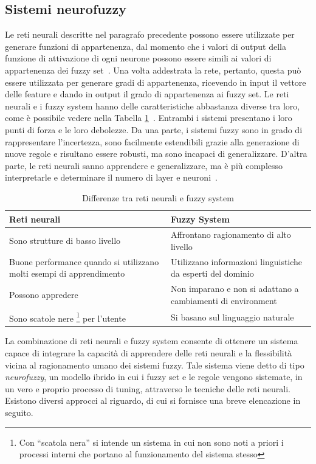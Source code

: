 \documentclass[11pt,  oneside, openany]{book}
\begin{document}
\subsection{Sistemi neurofuzzy}
Le reti neurali descritte nel paragrafo precedente possono essere utilizzate per generare funzioni di appartenenza, dal momento che i valori di output della funzione di attivazione di ogni neurone possono essere simili ai valori di appartenenza dei fuzzy set~\cite{membneuralnetwsimilar}. Una volta addestrata la rete, pertanto, questa può essere utilizzata per generare gradi di appartenenza, ricevendo in input il vettore delle feature e dando in output il grado di appartenenza ai fuzzy set. Le reti neurali e i fuzzy system hanno delle caratteristiche abbastanza diverse tra loro, come è possibile vedere nella Tabella \ref{table:0}~\cite{neurofuzzyintro}. Entrambi i sistemi presentano i loro punti di forza e le loro debolezze. Da una parte, i sistemi fuzzy sono in grado di rappresentare l'incertezza, sono facilmente estendibili grazie alla generazione di nuove regole e risultano essere robusti, ma sono incapaci di generalizzare. D'altra parte, le reti neurali sanno apprendere e generalizzare, ma è più complesso interpretarle e determinare il numero di layer e neuroni~\cite{surveyneurofuzzy}.


\begin{table}[h!]
\centering
\begin{tabular}{ |p{7cm}|p{7cm}| } 
\hline
\textbf{Reti neurali} & \textbf{Fuzzy System} \\
\hline
\hline
Sono strutture di basso livello & Affrontano ragionamento di alto livello\\ 
\hline
Buone performance quando si utilizzano molti esempi di apprendimento & Utilizzano informazioni linguistiche da esperti del dominio \\
\hline
Possono appredere & Non imparano e non si adattano a cambiamenti di environment \\
\hline
Sono scatole nere \footnote{Con ``scatola nera'' si intende un sistema in cui non sono noti a priori i processi interni che portano al funzionamento del sistema stesso} per l'utente & Si basano sul linguaggio naturale\\
\hline

\end{tabular}
\caption{Differenze tra reti neurali e fuzzy system}
\label{table:0}
\end{table}

La combinazione di reti neurali e fuzzy system consente di ottenere un sistema capace di integrare la capacità di apprendere delle reti neurali e la flessibilità vicina al ragionamento umano dei sistemi fuzzy. Tale sistema viene detto di tipo \textit{neurofuzzy}, un modello ibrido in cui i fuzzy set e le regole vengono sistemate, in un vero e proprio processo di tuning, attraverso le tecniche delle reti neurali. 
Esistono diversi approcci al riguardo, di cui si fornisce una breve elencazione in seguito. 
\end{document}
